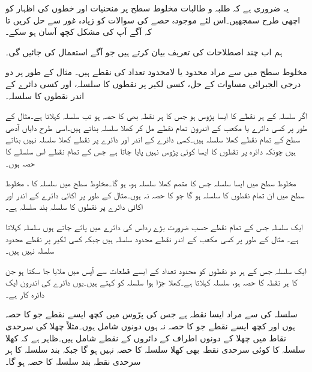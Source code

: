 یہ ضروری ہے کہ طلبہ و طالبات مخلوط سطح پر منحنیات اور خطوں کی اظہار کو اچھی طرح سمجھیں۔اس لئے موجودہ حصے کی سوالات کو زیادہ غور سے حل کریں تا کہ آگے آپ کی مشکل کچھ آسان ہو سکے۔

ہم اب چند اصطلاحات کی تعریف  بیان کرتے ہیں جو آگے استعمال کی جائیں گی۔

مخلوط سطح میں  سے مراد محدود یا لامحدود تعداد کی نقطے ہیں۔  مثال کے طور پر دو درجی الجبرائی مساوات کے حل، کسی لکیر پر نقطوں کا سلسلہ، اور کسی دائرے کے اندر نقطوں کا سلسلہ۔

اگر سلسلہ  کے ہر نقطے کا ایسا پڑوس ہو جس کا ہر نقطہ بھی  کا حصہ ہو تب   سلسلہ  کہلاتا ہے۔مثال کے طور پر کسی دائرے یا مکعب کے اندرون تمام نقطے  مل کر کھلا سلسلہ بناتے ہیں۔اسی طرح دایاں آدھی سطح  کے تمام نقطے کھلا سلسلہ ہیں۔کسی دائرے کے اندر اور دائرے پر نقطے  کھلا سلسلہ نہیں بناتے ہیں چونکہ دائرہ پر نقطوں کا ایسا کوئی پڑوس نہیں پایا جاتا ہے جس کے تمام نقطے اس سلسلے کا حصہ ہوں۔

 مخلوط سطح میں ایسا سلسلہ جس کا متمم کھلا سلسلہ ہو،  ہو گا۔مخلوط سطح میں سلسلہ  کا ، مخلوط سطح میں ان تمام نقطوں کا سلسلہ ہو گا جو  کا حصہ نہ ہوں۔مثال کے طور پر اکائی دائرے کے اندر اور اکائی دائرے پر نقطوں کا سلسلہ بند سلسلہ ہے۔

ایک سلسلہ جس کے تمام نقطے حسب ضرورت بڑے رداس کی دائرے میں پائے جاتے ہوں  سلسلہ کہلاتا ہے۔ مثال کے طور پر کسی مکعب کے اندر نقطے محدود سلسلہ ہیں جبکہ کسی لکیر پر نقطے محدود سلسلہ نہیں ہیں۔

ایک سلسلہ  جس کے ہر دو نقطوں کو محدود تعداد کے ایسے قطعات سے آپس میں ملایا جا سکتا ہو جن کا ہر نقطہ  کا حصہ ہو،  سلسلہ کہلاتا ہے۔کھلا جڑا ہوا سلسلہ کو  کہتے ہیں۔یوں دائرے کی اندرون ایک دائرہ کار ہے۔

سلسلہ  کی  سے مراد  ایسا نقطہ ہے جس کی پڑوس میں کچھ ایسے  نقطے جو  کا حصہ ہوں اور کچھ ایسے  نقطے جو  کا حصہ نہ ہوں دونوں شامل ہوں۔مثلاً چھلا کی سرحدی نقاط میں چھلا کے دونوں اطراف کے دائروں کے نقطے  شامل ہیں۔ظاہر ہے کہ کھلا سلسلہ  کا کوئی سرحدی نقطہ  بھی کھلا سلسلہ کا حصہ نہیں ہو گا جبکہ بند سلسلہ کا ہر سرحدی نقطہ بند سلسلہ کا حصہ ہو گا۔

